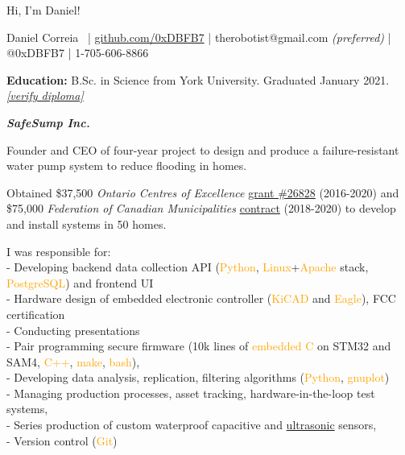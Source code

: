 \documentclass[fleqn,11pt]{article}
\newcommand{\ressection}[1]{\textbf{{\Large \textit{#1}}}\xrfill[0.1ex]{0.6pt}}
\newcommand{\sk}[1]{\textcolor{orange}{#1}}
\begin{document}



\begingroup
{}\selectfont

{\Huge Hi, I'm Daniel!}

\endgroup


\begin{center}
\small{{Daniel Correia}\  | \href{https://github.com/0xDBFB7}{github.com/0xDBFB7} | therobotist@gmail.com \textit{(preferred)} | @0xDBFB7 | 1-705-606-8866}\\
\light{\makebox[\linewidth]{\rule{\textwidth}{0.4pt}}}
\end{center}



\begin{tcolorbox}
\textbf{Education:} B.Sc. in Science from York University. Graduated January 2021. \href{https://learner.mycreds.ca/#/sharelink/b664abe7-53a7-4d64-a0f1-bef16337edd0/57724eeb-34ab-4b79-b2a6-cd6bc311039e}{\textit{[verify diploma]}}
\end{tcolorbox}


\ressection{SafeSump Inc.}

Founder and CEO of four-year project to design and produce a failure-resistant water pump system to reduce flooding in homes.

Obtained \$37,500 \textit{Ontario Centres of Excellence} \href{https://drive.google.com/file/d/1WXrxVwTggaL7WEvLv6DgJ891fSo7LqqP/view?usp=sharing}{grant \#26828} (2016-2020) and \$75,000 \textit{Federation of Canadian Municipalities} \href{https://drive.google.com/file/d/11pdJNzYDE-28X3m0rH8mE4cxoliTJZGH/view?usp=sharing}{contract} (2018-2020) to develop and install systems in 50 homes.

I was responsible for: \\
- Developing backend data collection API (\sk{Python}, \sk{Linux}+\sk{Apache} stack, \sk{PostgreSQL}) and frontend UI\\
- Hardware design of embedded electronic controller (\sk{KiCAD} and \sk{Eagle}), FCC certification\\
- Conducting presentations\\
- Pair programming secure firmware (10k lines of \sk{embedded C} on STM32 and SAM4, \sk{C++}, \sk{make}, \sk{bash}), \\
- Developing data analysis, replication, filtering algorithms (\sk{Python}, \sk{gnuplot})\\
- Managing production processes, asset tracking, hardware-in-the-loop test systems, \\
- Series production of custom waterproof capacitive and \href{https://github.com/0xDBFB7/UltimateUltrasonicAmplifier}{ultrasonic} sensors,\\
- Version control (\sk{Git})
\end{document}
